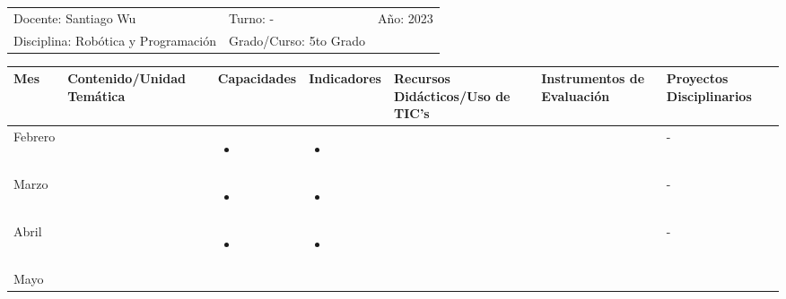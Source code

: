 \documentclass[landscape, a4paper, 10pt]{article}
\newcommand{\smallcellwidth}{0.7in}
\newcommand{\normalcellwidth}{1.2in}
\newcommand{\bigcellwidth}{2.0in}
\newcommand{\profesor}{Santiago Wu}
\newcommand{\discipline}{Robótica y Programación}
\newcommand{\currentyear}{2023}
\begin{document}
	\pagebreak[4]
	\begin{tabularx}{\textwidth}{ >{\raggedright\arraybackslash}X >{\raggedright\arraybackslash}X >{\raggedright\arraybackslash}X }
		Docente: \profesor &
		Turno: - &
		Año: \currentyear \\
		Disciplina: \discipline &
		Grado/Curso: 5to Grado &
		 \\
	\end{tabularx}
	\centering
	\begin{longtable}{|m{\smallcellwidth}|p{\normalcellwidth}|p{\bigcellwidth}|p{\bigcellwidth}|p{\normalcellwidth}|p{\normalcellwidth}|p{\normalcellwidth}|}
		\hline
		\textbf{Mes} &
		\textbf{Contenido/Unidad Temática} &
		\textbf{Capacidades} &
		\textbf{Indicadores} &
		\textbf{Recursos Didácticos/Uso de TIC's} &
		\textbf{Instrumentos de Evaluación} &
		\textbf{Proyectos Disciplinarios} \\
		\hline
		\endhead
		Febrero &
		 &
		\begin{itemize}
			\item 
		\end{itemize} &
		\begin{itemize}
			\item 
		\end{itemize} &
		  &
		  &
		 - \\
		\hline
		Marzo &
		 &
		\begin{itemize}
			\item 
		\end{itemize} &
		\begin{itemize}
			\item 
		\end{itemize} &
		  &
		  &
		 - \\
		\hline
		Abril &
		 &
		\begin{itemize}
			\item 
		\end{itemize} &
		\begin{itemize}
			\item 
		\end{itemize} &
		  &
		  &
		 - \\
		\hline
		Mayo &
		 &
		\begin{itemize}

\end{itemize}
\end{longtable}
\end{document}

